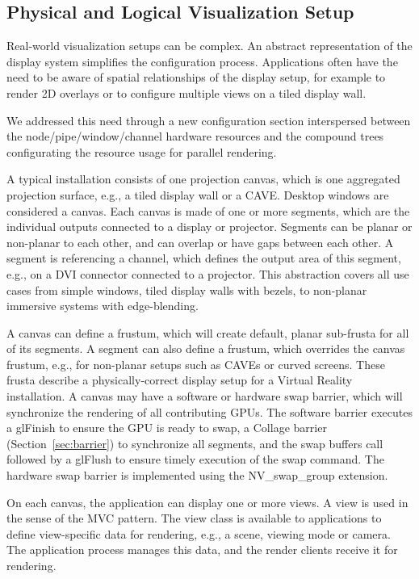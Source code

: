 \documentclass[10pt,journal,compsoc]{IEEEtran}
\newcommand{\sref}[1]{Section~\ref{#1}}
\begin{document}
\subsection{Physical and Logical Visualization Setup}

Real-world visualization setups can be complex. An abstract representation of
the display system simplifies the configuration process. Applications often have
the need to be aware of spatial relationships of the display setup, for example
to render 2D overlays or to configure multiple views on a tiled display wall.

We addressed this need through a new configuration section interspersed between
the node/pipe/window/channel hardware resources and the compound trees
configurating the resource usage for parallel rendering.

A typical installation consists of one projection canvas, which is one
aggregated projection surface, e.g., a tiled display wall or a CAVE. Desktop
windows are considered a canvas. Each canvas is made of one or more segments,
which are the individual outputs connected to a display or projector. Segments
can be planar or non-planar to each other, and can overlap or have gaps between
each other. A segment is referencing a channel, which defines the output area of
this segment, e.g., on a DVI connector connected to a projector. This
abstraction covers all use cases from simple windows, tiled display walls with
bezels, to non-planar immersive systems with edge-blending.

A canvas can define a frustum, which will create default, planar sub-frusta for
all of its segments. A segment can also define a frustum, which overrides the
canvas frustum, e.g., for non-planar setups such as CAVEs or curved screens.
These frusta describe a physically-correct display setup for a Virtual Reality
installation. \label{sec:swap} A canvas may have a software or hardware swap
barrier, which will synchronize the rendering of all contributing GPUs. The
software barrier executes a \textsf{glFinish} to ensure the GPU is ready to
swap, a \textsf{Collage} barrier (\sref{sec:barrier}) to synchronize all
segments, and the swap buffers call followed by a \textsf{glFlush} to ensure timely
execution of the swap command. The hardware swap barrier is implemented using
the \textsf{NV\_swap\_group} extension.

On each canvas, the application can display one or more views. A view is used in
the sense of the MVC pattern. The view class is available to applications to
define view-specific data for rendering, e.g., a scene, viewing mode or camera.
The application process manages this data, and the render clients receive it for
rendering.
\end{document}
